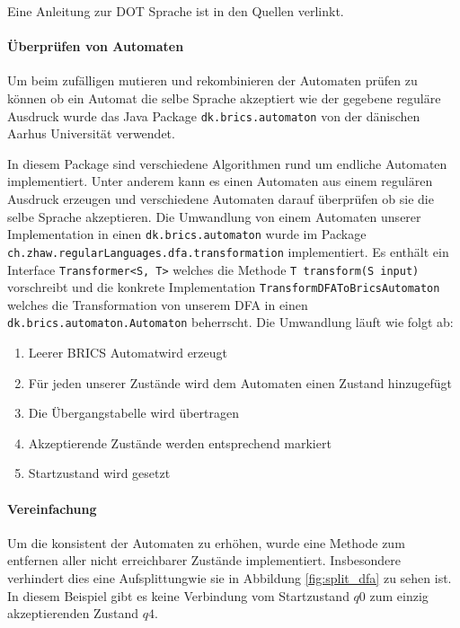 Eine Anleitung zur DOT Sprache ist in den Quellen verlinkt. \cite{graphvizdotref}

\paragraph{Überprüfen von Automaten}
Um beim zufälligen mutieren und rekombinieren der Automaten prüfen zu können ob ein Automat die selbe Sprache akzeptiert wie der gegebene reguläre Ausdruck wurde das Java Package \lstinline$dk.brics.automaton$ von der dänischen Aarhus Universität verwendet.\cite{bricsautomaton}

In diesem Package sind verschiedene Algorithmen rund um endliche Automaten implementiert. Unter anderem kann es einen Automaten aus einem regulären Ausdruck erzeugen und verschiedene Automaten darauf überprüfen ob sie die selbe Sprache akzeptieren. Die Umwandlung von einem Automaten unserer Implementation in einen \lstinline$dk.brics.automaton$ wurde im Package \lstinline$ch.zhaw.regularLanguages.dfa.transformation$ implementiert. Es enthält ein Interface \lstinline$Transformer<S, T>$ welches die Methode \lstinline$T transform(S input)$ vorschreibt und die konkrete Implementation \lstinline$TransformDFAToBricsAutomaton$ welches die Transformation von unserem DFA in einen \lstinline$dk.brics.automaton.Automaton$ beherrscht. Die Umwandlung läuft wie folgt ab:
\begin{enumerate}
  \item Leerer \flqq BRICS Automat\frqq wird erzeugt
  \item Für jeden unserer Zustände wird dem Automaten einen Zustand hinzugefügt
  \item Die Übergangstabelle wird übertragen
  \item Akzeptierende Zustände werden entsprechend markiert
  \item Startzustand wird gesetzt
\end{enumerate}

\paragraph{Vereinfachung}
Um die konsistent der Automaten zu erhöhen, wurde eine Methode zum entfernen aller nicht erreichbarer Zustände implementiert. Insbesondere verhindert dies eine \flqq Aufsplittung\frqq wie sie in Abbildung \ref{fig:split_dfa} zu sehen ist. In diesem Beispiel gibt es keine Verbindung vom Startzustand $q0$ zum einzig akzeptierenden Zustand $q4$.

